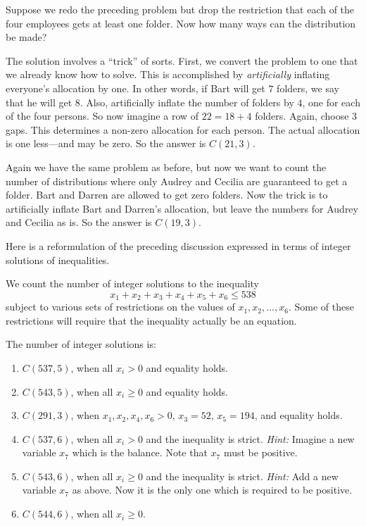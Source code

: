 \begin{example}
Suppose we redo the preceding problem but drop the restriction
that each of the four employees gets at least one folder.  
Now how many ways can the distribution be made?

The solution involves a ``trick'' of sorts.  First, we convert the
problem to one that we already know how to solve.  This is
accomplished by \textit{artificially} inflating everyone's allocation
by one.  In other words, if Bart will get $7$ folders, we say that he
will get $8$.  Also, artificially inflate the number of folders by
$4$, one for each of the four persons.  So now imagine a row of
$22=18+4$ folders.  Again, choose $3$ gaps.  This determines a
non-zero allocation for each person.  The actual allocation is one
less---and may be zero.  So the answer is $C(21,3)$.
\end{example}

\begin{example}
  Again we have the same problem as before, but now we want to count
  the number of distributions where only Audrey and Cecilia are
  guaranteed to get a folder. Bart and Darren are allowed to get zero
  folders.  Now the trick is to artificially inflate Bart and Darren's
  allocation, but leave the numbers for Audrey and Cecilia as is.  So
  the answer is $C(19,3)$.
\end{example}

\begin{example}
Here is a reformulation of the preceding discussion expressed in terms
of integer solutions of inequalities.

We count the number of integer solutions to the inequality
\[
x_1+x_2+x_3+x_4+x_5+x_6\le 538
\]
subject to various sets of restrictions on the values of
$x_1,x_2,\dots,x_6$.  Some of these restrictions will require
that the inequality actually be an equation.
 
The number of integer solutions is:

\begin{enumerate}
\item $C(537,5)$, when all $x_i> 0$ and equality holds.
\item $C(543,5)$, when all $x_i\ge 0$ and equality holds.
\item $C(291,3)$, when $x_1,x_2,x_4,x_6>0$, $x_3=52$,
$x_5=194$, and equality holds.
\item $C(537,6)$, when all $x_i > 0$ and the inequality is
strict. \textit{Hint:} Imagine a new variable $x_7$ which is
the balance.  Note that $x_7$ must be positive.
\item $C(543,6)$, when all $x_i \ge 0$ and the inequality is
strict. \textit{Hint:} Add a new variable $x_7$ as above.   Now it
is the only one which is required to be positive.
\item $C(544,6)$, when all $x_i \ge 0$.
\end{enumerate}
\end{example}

